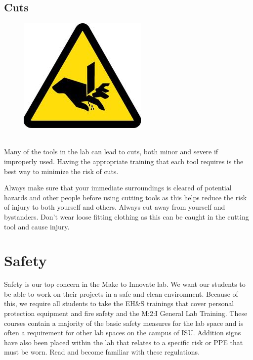 \subsection{Cuts}
\begin{framed}
\begin{figure}
\includegraphics[width=\linewidth]{images/cut_hazard.jpg}
\end{figure}
\ \\
Many of the tools in the lab can lead to cuts, both minor and severe if improperly used. Having the appropriate training that each tool requires is the best way to minimize the risk of cuts. 
\end{framed}
Always make sure that your immediate surroundings is cleared of potential hazards and other people before using cutting tools as this helps reduce the risk of injury to both yourself and others. Always cut away from yourself and bystanders. Don’t wear loose fitting clothing as this can be caught in the cutting tool and cause injury. 

\section{Safety}
Safety is our top concern in the Make to Innovate lab.  We want our students to be able to work on their projects in a safe and clean environment.  Because of this, we require all students to take the EH\&S trainings that cover personal protection equipment and fire safety and the M:2:I General Lab Training.  These courses contain a majority of the basic safety measures for the lab space and is often a requirement for other lab spaces on the campus of ISU. Addition signs have also been placed within the lab that relates to a specific risk or PPE that must be worn.  Read and become familiar with these regulations. 

